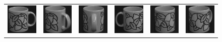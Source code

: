 \begin{figure}[p]
\begin{center}
\begin{tabular}{cccccc}
\includegraphics[width=2cm]{coil/beeld-48.eps} &
\includegraphics[width=2cm]{coil/beeld-49.eps} &
\includegraphics[width=2cm]{coil/beeld-50.eps} &
\includegraphics[width=2cm]{coil/beeld-51.eps} &
\includegraphics[width=2cm]{coil/beeld-52.eps} &
\includegraphics[width=2cm]{coil/beeld-53.eps} \\


\end{tabular}
\end{center}
\end{figure}
